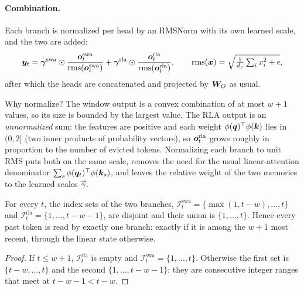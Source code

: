\paragraph{Combination.} Each branch is normalized per head by an RMSNorm with its own learned
scale, and the two are added:
\begin{equation}\label{eq:c04-ratt-mix}
  \bm{y}_t=\bm{\gamma}^{\mathrm{swa}}\odot\frac{\bm{o}^{\mathrm{swa}}_t}{\mathrm{rms}(\bm{o}^{\mathrm{swa}}_t)}
  +\bm{\gamma}^{\mathrm{rla}}\odot\frac{\bm{o}^{\mathrm{rla}}_t}{\mathrm{rms}(\bm{o}^{\mathrm{rla}}_t)},
  \qquad \mathrm{rms}(\bm{x})=\sqrt{\tfrac{1}{d_v}\textstyle\sum_i x_i^2+\epsilon},
\end{equation}
after which the heads are concatenated and projected by $\bm{W}_O$ as usual.

Why normalize? The window output is a convex combination of at most $w+1$ values, so its size is
bounded by the largest value. The RLA output is an \emph{unnormalized} sum: the features are
positive and each weight $\phi(\bm{q})^{\top}\phi(\bm{k})$ lies in $(0,2]$ (two inner products of probability
vectors), so $\bm{o}^{\mathrm{rla}}_t$ grows roughly in proportion to the number of evicted tokens.
Normalizing each branch to unit RMS puts both on the same scale, removes the need for the
usual linear-attention denominator $\sum_s\phi(\bm{q}_t)^{\top}\phi(\bm{k}_s)$, and leaves the relative weight
of the two memories to the learned scales $\vec\gamma$.

\begin{proposition}\label{prop:c04-ratt-partition}
For every $t$, the index sets of the two branches,
$\mathcal{I}^{\mathrm{swa}}_t=\{\max(1,t-w),\dots,t\}$ and $\mathcal{I}^{\mathrm{rla}}_t=\{1,\dots,t-w-1\}$,
are disjoint and their union is $\{1,\dots,t\}$. Hence every past token is read by exactly one
branch: exactly if it is among the $w+1$ most recent, through the linear state otherwise.
\end{proposition}
\begin{proof}
If $t\le w+1$, $\mathcal{I}^{\mathrm{rla}}_t$ is empty and $\mathcal{I}^{\mathrm{swa}}_t=\{1,\dots,t\}$.
Otherwise the first set is $\{t-w,\dots,t\}$ and the second $\{1,\dots,t-w-1\}$; they are
consecutive integer ranges that meet at $t-w-1<t-w$.
\end{proof}

